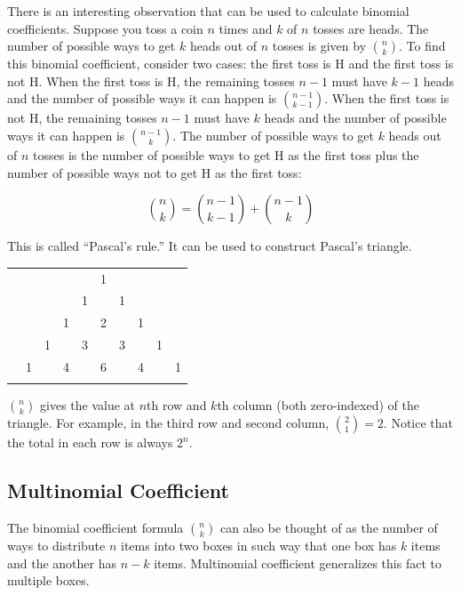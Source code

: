 There is an interesting observation that can be used to calculate binomial coefficients. Suppose you toss a coin $n$ times and $k$ of $n$ tosses are heads. The number of possible ways to get $k$ heads out of $n$ tosses is given by $\binom{n}{k}$. To find this binomial coefficient, consider two cases: the first toss is H and the first toss is not H. When the first toss is H, the remaining tosses $n-1$ must have $k-1$ heads and the number of possible ways it can happen is $\binom{n-1}{k-1}$. When the first toss is not H,  the remaining tosses $n-1$ must have $k$ heads and the number of possible ways it can happen is $\binom{n-1}{k}$. The number of possible ways to get $k$ heads out of $n$ tosses is the number of possible ways to get H as the first toss plus the number of possible ways not to get H as the first toss:

$$\binom{n}{k} = \binom{n-1}{k-1} + \binom{n-1}{k}$$

This is called ``Pascal's rule.'' It can be used to construct Pascal's triangle.

\begin{center}
	\begin{tabular}{rccccccccc}
		&    &    &    &    &  1\\\noalign{\smallskip\smallskip}
		&    &    &    &  1 &    &  1\\\noalign{\smallskip\smallskip}
		&    &    &  1 &    &  2 &    &  1\\\noalign{\smallskip\smallskip}
		&    &  1 &    &  3 &    &  3 &    &  1\\\noalign{\smallskip\smallskip}
		&  1 &    &  4 &    &  6 &    &  4 &    &  1\\\noalign{\smallskip\smallskip}
	\end{tabular}
\end{center}

$\binom{n}{k}$ gives the value at $n$th row and $k$th column (both zero-indexed) of the triangle. For example, in the third row and second column, $\binom{2}{1}=2$. Notice that the total in each row is always $2^n$.

\subsection{Multinomial Coefficient}

The binomial coefficient formula $\binom{n}{k}$ can also be thought of as the number of ways to distribute $n$ items into two boxes in such way that one box has $k$ items and the another has $n-k$ items. Multinomial coefficient generalizes this fact to multiple boxes. \\

